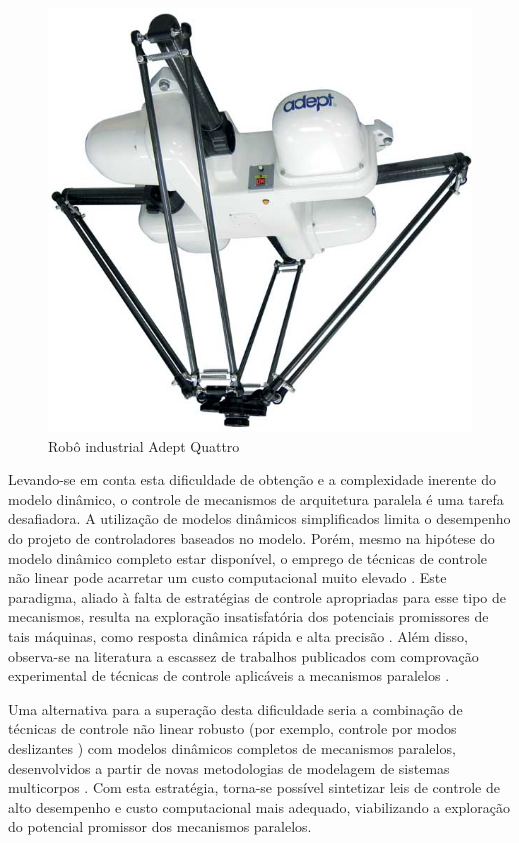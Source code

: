 \documentclass[]{politex}
\begin{document}
\begin{figure}[h!]
	\centering
	\includegraphics[scale=0.17]{../figures/theadeptquat.jpg}  
	\caption{Robô industrial Adept Quattro}
	\label{fig:Mecanismo}
\end{figure}

Levando-se em conta esta dificuldade de obtenção e a complexidade inerente do modelo dinâmico, o controle de mecanismos de arquitetura paralela é uma tarefa desafiadora. A utilização de modelos dinâmicos simplificados limita o desempenho do projeto de controladores baseados no modelo. Porém, mesmo na hipótese do modelo dinâmico completo estar disponível, o emprego de técnicas de controle não linear pode acarretar um custo  computacional muito elevado \cite{Craig, Slotini, Zubizarreta}. Este paradigma, aliado à falta de estratégias de controle apropriadas para esse tipo de mecanismos, resulta na exploração insatisfatória dos potenciais promissores de tais máquinas, como resposta dinâmica rápida e alta precisão \cite{Abdellatif}. Além disso, observa-se na literatura a escassez de trabalhos publicados com comprovação experimental de técnicas de controle aplicáveis a mecanismos paralelos \cite{Rynaldo}.
	
    Uma alternativa para a superação desta dificuldade seria a combinação de técnicas de controle não linear robusto (por exemplo, controle por modos deslizantes \cite{Slotini, Utkin}) com modelos dinâmicos completos de mecanismos paralelos, desenvolvidos a partir de novas metodologias de modelagem de sistemas multicorpos \cite{22orsino, Orsino2013, 23orsino, 21orsino}. Com esta estratégia, torna-se possível sintetizar leis de controle de alto desempenho e custo computacional mais adequado, viabilizando a exploração do potencial promissor dos mecanismos paralelos.
\end{document}

